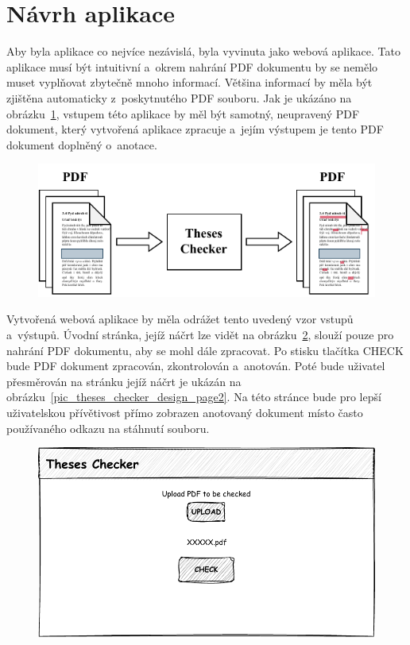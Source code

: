 \section{Návrh aplikace}
Aby byla aplikace co nejvíce nezávislá, byla vyvinuta jako webová aplikace.
Tato aplikace musí být intuitivní a~okrem nahrání PDF dokumentu by se nemělo
muset vyplňovat zbytečně mnoho informací. Většina informací by měla být
zjištěna automaticky z~poskytnutého PDF souboru. Jak je ukázáno na
obrázku~\ref{pic_theses_checker_dia}, vstupem této aplikace by měl být
samotný, neupravený PDF dokument, který vytvořená aplikace zpracuje
a~jejím výstupem je tento PDF dokument doplněný o~anotace.

\begin{figure}[H]
    \label{pic_theses_checker_dia}
    \centering
    \includegraphics[width=\linewidth]{obrazky-figures/Theses_Checker_diagram.pdf}
    \caption{}
\end{figure}

Vytvořená webová aplikace by měla odrážet tento uvedený vzor vstupů a~výstupů.
Úvodní stránka, jejíž náčrt lze vidět na
obrázku~\ref{pic_theses_checker_design_page1}, slouží pouze pro nahrání
PDF dokumentu, aby se mohl dále zpracovat. Po stisku tlačítka CHECK bude
PDF dokument zpracován, zkontrolován a~anotován. Poté bude uživatel přesměrován na
stránku jejíž náčrt je ukázán na obrázku~\ref{pic_theses_checker_design_page2}.
Na této stránce bude pro lepší uživatelskou přívětivost přímo zobrazen
anotovaný dokument místo často používaného odkazu na stáhnutí souboru.

\begin{figure}[H]
    \label{pic_theses_checker_design_page1}
    \centering
    \includegraphics[width=0.8\linewidth]{obrazky-figures/Theses_Checker_design-page1.pdf}
    \caption{}
\end{figure}

